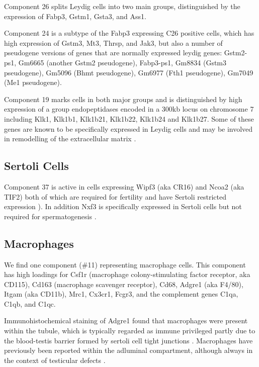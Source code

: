 Component 26 splits Leydig cells into two main groups, distinguished by the expression of Fabp3, Gstm1, Gsta3, and Ass1.

Component 24 is a subtype of the Fabp3 expressing C26 positive cells, which has high expression of Gstm3, Mt3, Thrsp, and Jak3, but also a number of pseudogene versions of genes that are normally expressed leydig genes: Gstm2-ps1, Gm6665 (another Gstm2 pseudogene), Fabp3-ps1, Gm8834 (Gstm3 pseudogene), Gm5096 (Bhmt pseudogene), Gm6977 (Fth1 pseudogene), Gm7049 (Me1 pseudogene).

Component 19 marks cells in both major groups and is distinguished by high expression of a group endopeptidases encoded in a 300kb locus on chromosome 7 including Klk1, Klk1b1, Klk1b21, Klk1b22, Klk1b24 and Klk1b27. Some of these genes are known to be specifically expressed in Leydig cells and may be involved in remodelling of the extracellular matrix \parencite{Sanz2013RiboTag, Matsui2000Cloning, Matsui2001Mouse, Matsui2005Characterization}.

\subsection{Sertoli Cells}

Component 37 is active in cells expressing Wipf3 (aka CR16) and Ncoa2 (aka TIF2) both of which are required for fertility and have Sertoli restricted expression \cite{Suetsugu2007Malespecific, Gehin2002Function}). In addition Nxf3 is specifically expressed in Sertoli cells but not required for spermatogenesis \cite{Zhou2011Nxf3}.



\subsection{Macrophages}
We find one component (\#11) representing macrophage cells. This component has high loadings for Csf1r (macrophage colony-stimulating factor receptor, aka CD115), Cd163 (macrophage scavenger receptor), Cd68, Adgre1 (aka F4/80), Itgam (aka CD11b), Mrc1, Cx3cr1, Fcgr3, and the complement genes C1qa, C1qb, and C1qc. \parencite{Mossadegh-Keller2017Developmental, Fabriek2005macrophage, Sasmono2012Generation}

Immunohistochemical staining of Adgre1 found that macrophages were present within the tubule, which is typically regarded as immune privileged partly due to the blood-testis barrier formed by sertoli cell tight junctions \parencite{Fijak2006testis}. Macrophages have previously been reported within the adluminal compartment, although always in the context of testicular defects \parencite{Frungieri2002Number, Goluza2014Macrophages}.



